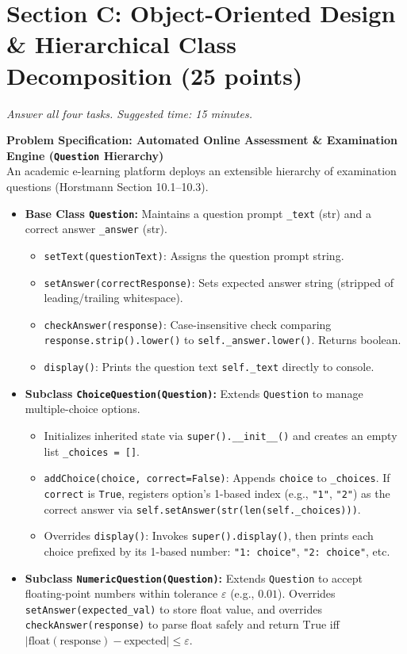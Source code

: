 \documentclass[11pt,a4paper]{article}
\begin{document}
\section*{Section C: Object-Oriented Design \& Hierarchical Class Decomposition \hfill \normalsize\normalfont(25 points)}
\textit{Answer all four tasks. Suggested time: 15 minutes.}
\begin{tcolorbox}[colback=boxbg,colframe=secondaryteal,arc=1.5mm,boxrule=0.6pt,top=1.5mm,bottom=1.5mm]
\textbf{Problem Specification: Automated Online Assessment \& Examination Engine (\texttt{Question} Hierarchy)}\\[0.5mm]
\small
An academic e-learning platform deploys an extensible hierarchy of examination questions (Horstmann Section 10.1--10.3).
\begin{itemize}
\item \textbf{Base Class \texttt{Question}:} Maintains a question prompt \texttt{\_text} (str) and a correct answer \texttt{\_answer} (str).
  \begin{itemize}
  \item \texttt{setText(questionText)}: Assigns the question prompt string.
  \item \texttt{setAnswer(correctResponse)}: Sets expected answer string (stripped of leading/trailing whitespace).
  \item \texttt{checkAnswer(response)}: Case-insensitive check comparing \texttt{response.strip().lower()} to \texttt{self.\_answer.lower()}. Returns boolean.
  \item \texttt{display()}: Prints the question text \texttt{self.\_text} directly to console.
  \end{itemize}
\item \textbf{Subclass \texttt{ChoiceQuestion(Question)}:} Extends \texttt{Question} to manage multiple-choice options.
  \begin{itemize}
  \item Initializes inherited state via \texttt{super().\_\_init\_\_()} and creates an empty list \texttt{\_choices = []}.
  \item \texttt{addChoice(choice, correct=False)}: Appends \texttt{choice} to \texttt{\_choices}. If \texttt{correct} is \texttt{True}, registers option's 1-based index (e.g., \texttt{"1"}, \texttt{"2"}) as the correct answer via \texttt{self.setAnswer(str(len(self.\_choices)))}.
  \item Overrides \texttt{display()}: Invokes \texttt{super().display()}, then prints each choice prefixed by its 1-based number: \texttt{"1: choice"}, \texttt{"2: choice"}, etc.
  \end{itemize}
\item \textbf{Subclass \texttt{NumericQuestion(Question)}:} Extends \texttt{Question} to accept floating-point numbers within tolerance $\varepsilon$ (e.g., $0.01$). Overrides \texttt{setAnswer(expected\_val)} to store float value, and overrides \texttt{checkAnswer(response)} to parse float safely and return $\text{True}$ iff $|\text{float}(\text{response}) - \text{expected}| \le \varepsilon$.
\end{itemize}
\end{tcolorbox}
\end{document}
